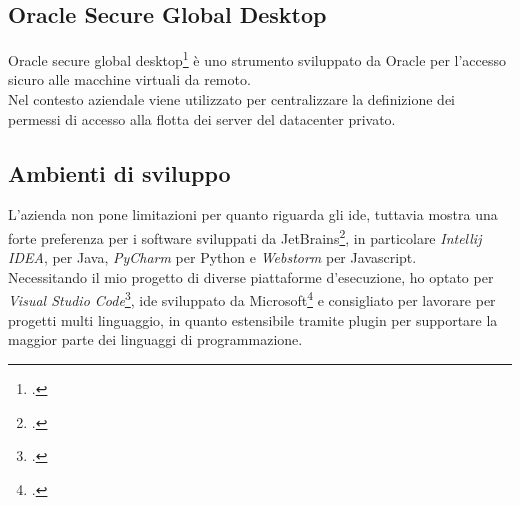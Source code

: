 \subsection{Oracle Secure Global Desktop}
Oracle secure global desktop\footcite{site:osgd}  è uno strumento sviluppato da Oracle per l'accesso sicuro alle macchine virtuali da remoto.\\
Nel contesto aziendale viene utilizzato per centralizzare la definizione dei permessi di accesso alla flotta dei server del \gls{datacenter} privato. 
\subsection{Ambienti di sviluppo}
L'azienda non pone limitazioni per quanto riguarda gli \gls{ide}, tuttavia mostra una forte preferenza per i software sviluppati da JetBrains\footcite{site:jetbrains}, in particolare \textit{Intellij IDEA}, per Java, \textit{PyCharm} per Python e \textit{Webstorm} per Javascript. \\
Necessitando il mio progetto di diverse piattaforme d'esecuzione, ho optato per \textit{Visual Studio Code}\footcite{site:vscode}, \gls{ide} sviluppato da Microsoft\footcite{site:microsoft} e consigliato per lavorare per progetti multi linguaggio, in quanto estensibile tramite \gls{plugin} per supportare la maggior parte dei linguaggi di programmazione.  